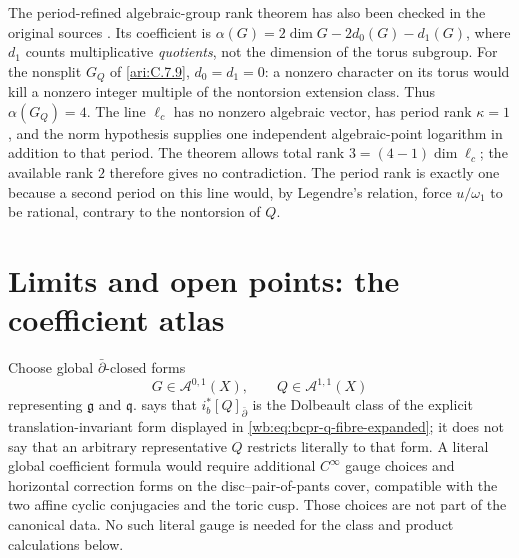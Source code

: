 The period-refined algebraic-group rank theorem has also been
checked in the original sources
\citep[Theorem 4.1 and Corollary 4.3]{waldschmidt1988periodrank}
\citep[main theorem, p.~363]{roy1993periodrank}.
Its coefficient is
$\alpha(G)=2\dim G-2d_0(G)-d_1(G)$, where $d_1$
counts multiplicative \emph{quotients}, not the dimension of
the torus subgroup.  For the nonsplit $G_Q$ of \ref{ari:C.7.9},
$d_0=d_1=0$: a nonzero character on its torus would kill
a nonzero integer multiple of the nontorsion extension class.
Thus $\alpha(G_Q)=4$.  The line $\ell_c$ has no nonzero
algebraic vector, has period rank $\kappa=1$, and the norm
hypothesis supplies one independent algebraic-point logarithm
in addition to that period.  The theorem allows total rank
$3=(4-1)\dim\ell_c$; the available rank $2$ therefore gives
no contradiction.  The period rank is exactly one because
a second period on this line would, by Legendre's relation,
force $u/\omega_1$ to be rational, contrary to the
nontorsion of $Q$.



\section{Limits and open points: the coefficient atlas}
\begin{remark}
\label{wb:rem:bcpr-literal-gauge}
Choose global $\bar\partial$-closed forms
\begin{equation}
 G\in\mathcal A^{0,1}(X),\qquad
 Q\in\mathcal A^{1,1}(X)
\end{equation}
representing $\mathfrak g$ and $\mathfrak q$.
 says that
$i_b^*[Q]_{\bar\partial}$ is the Dolbeault class of the explicit
translation-invariant
form displayed in \cref{wb:eq:bcpr-q-fibre-expanded}; it does not say that an arbitrary
representative $Q$ restricts literally to that form.  A literal global
coefficient formula would require additional $C^\infty$ gauge choices and
horizontal correction forms on the disc--pair-of-pants cover, compatible
with the two affine cyclic conjugacies and the toric cusp.  Those choices
are not part of the canonical data.  No such literal gauge is needed for
the class and product calculations below.
\end{remark}

